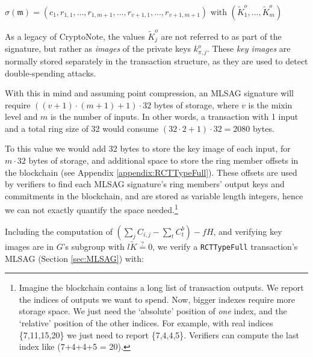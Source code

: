 \hfill \(\sigma(\mathfrak{m}) = (c_1, r_{1, 1}, ..., r_{1, m+1}, ..., r_{v+1, 1}, ..., r_{v+1, m+1}) \textrm{ with } (\tilde{K}^o_1, ..., \tilde{K}^o_m) \) \hfill \phantom{.}

As a legacy of CryptoNote, the values \(\tilde{K}^o_j\) are not referred to as part of the signature, but rather as {\em images} of the private keys $k^o_{\pi,j}$. These {\em key images} are normally stored separately in the transaction structure, as they are used to detect double-spending attacks.

With this in mind and assuming point compression, an MLSAG signature will require $((v + 1) \cdot (m + 1) + 1) \cdot 32$ bytes of storage, where $v$ is the mixin level and $m$ is the number of inputs. In other words, a transaction with 1 input and a total ring size of 32 would consume $(32 \cdot 2 + 1) \cdot 32 = 2080$ bytes.

To this value we would add 32 bytes to store the key image of each input, for $m \cdot 32$ bytes of storage, and additional space to store the ring member offsets in the blockchain (see Appendix \ref{appendix:RCTTypeFull}). These offsets are used by verifiers to find each MLSAG signature's ring members' output keys and commitments in the blockchain, and are stored as variable length integers, hence we can not exactly quantify the space needed.\footnote{Imagine the blockchain contains a long list of transaction outputs. We report the indices of outputs we want to spend. Now, bigger indexes require more storage space. We just need the `absolute' position of {\em one} index, and the `relative' position of the other indices. For example, with real indices \{7,11,15,20\} we just need to report \{7,4,4,5\}. Verifiers can compute the last index like (7+4+4+5 = 20).}%

Including the computation of \((\sum\limits_j C_{i, j} - \sum\limits_t C^b_{t}) - f H\), and verifying key images are in $G$'s subgroup with $l \tilde{K} \stackrel{?}{=} 0$, we verify a {\tt RCTTypeFull} transaction's MLSAG (Section \ref{sec:MLSAG}) with:


